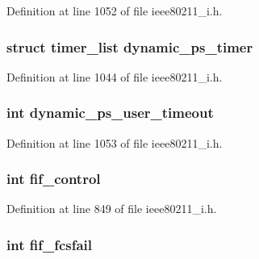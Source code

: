 Definition at line 1052 of file ieee80211\-\_\-i.\-h.

\hypertarget{structieee80211__local_a7cd1b6141c7f2492a8b286e9e013ae73}{
\subsubsection[{dynamic\-\_\-ps\-\_\-timer}]{\setlength{\rightskip}{0pt plus 5cm}struct timer\-\_\-list dynamic\-\_\-ps\-\_\-timer}}\label{structieee80211__local_a7cd1b6141c7f2492a8b286e9e013ae73}


Definition at line 1044 of file ieee80211\-\_\-i.\-h.

\hypertarget{structieee80211__local_a47de19fba894ad848cda173ecc4d47e7}{
\subsubsection[{dynamic\-\_\-ps\-\_\-user\-\_\-timeout}]{\setlength{\rightskip}{0pt plus 5cm}int dynamic\-\_\-ps\-\_\-user\-\_\-timeout}}\label{structieee80211__local_a47de19fba894ad848cda173ecc4d47e7}


Definition at line 1053 of file ieee80211\-\_\-i.\-h.

\hypertarget{structieee80211__local_af26c59857ac99739a98a86955ccb73f4}{
\subsubsection[{fif\-\_\-control}]{\setlength{\rightskip}{0pt plus 5cm}int fif\-\_\-control}}\label{structieee80211__local_af26c59857ac99739a98a86955ccb73f4}


Definition at line 849 of file ieee80211\-\_\-i.\-h.

\hypertarget{structieee80211__local_a27eb74fe97bc47632e4e68f9987b7676}{
\subsubsection[{fif\-\_\-fcsfail}]{\setlength{\rightskip}{0pt plus 5cm}int fif\-\_\-fcsfail}}\label{structieee80211__local_a27eb74fe97bc47632e4e68f9987b7676}


